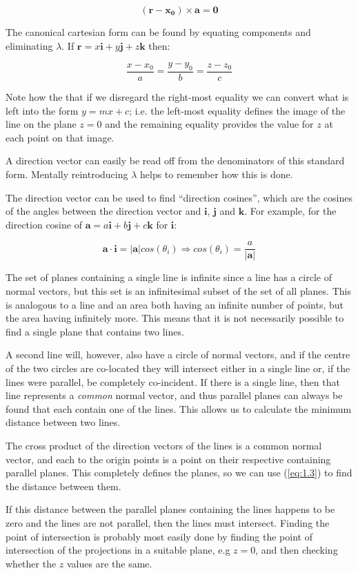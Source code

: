 \documentclass[a5paper]{article}
\begin{document}
\begin{equation}
  (\bm{r} - \bm{x_0}) \times \bm{a} = \bm{0}
\end{equation}

The canonical cartesian form can be found by equating components and eliminating
$\lambda$. If $\bm{r} = x\bm{i} + y\bm{j} + z\bm{k}$ then:

\begin{equation}
  \frac{x - x_0}{a} = \frac{y - y_0}{b} = \frac{z - z_0}{c}
\end{equation}

Note how the that if we disregard the right-most equality we can convert what is
left into the form $y = mx + c$; i.e. the left-most equality defines the image
of the line on the plane $z = 0$ and the remaining equality provides the value
for $z$ at each point on that image.

A direction vector can easily be read off from the denominators of this standard
form. Mentally reintroducing $\lambda$ helps to remember how this is done.

The direction vector can be used to find ``direction cosines'', which are the
cosines of the angles between the direction vector and $\bm{i}$, $\bm{j}$ and
$\bm{k}$. For example, for the direction cosine of $\bm{a} = a\bm{i} + b\bm{j} +
c\bm{k}$ for $\bm{i}$:

\begin{equation}
  \bm{a} \cdot \bm{i} = |\bm{a}|cos(\theta_i) \Rightarrow cos(\theta_i) = \frac{a}{|\bm{a}|}
\end{equation}

The set of planes containing a single line is infinite since a line has a circle
of normal vectors, but this set is an infinitesimal subset of the set of all
planes. This is analogous to a line and an area both having an infinite number
of points, but the area having infinitely more. This means that it is not
necessarily possible to find a single plane that contains two lines.

A second line will, however, also have a circle of normal vectors, and if the
centre of the two circles are co-located they will intersect either in a single
line or, if the lines were parallel, be completely co-incident. If there is a
single line, then that line represents a \textit{common} normal vector, and thus
parallel planes can always be found that each contain one of the lines. This
allows us to calculate the minimum distance between two lines.

The cross product of the direction vectors of the lines is a common normal
vector, and each to the origin points is a point on their respective containing
parallel planes. This completely defines the planes, so we can use
(\ref{eq:1.3}) to find the distance between them.

If this distance between the parallel planes containing the lines happens to be
zero and the lines are not parallel, then the lines must intersect. Finding the
point of intersection is probably most easily done by finding the point of
intersection of the projections in a suitable plane, e.g $z = 0$, and then
checking whether the $z$ values are the same.
\end{document}
